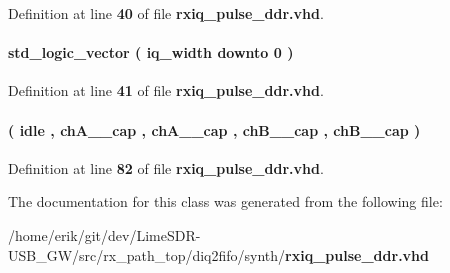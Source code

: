 Definition at line {\bf 40} of file {\bf rxiq\+\_\+pulse\+\_\+ddr.\+vhd}.

\paragraph[{reg\+\_\+l\+\_\+0}]{ {\bfseries \textcolor{comment}{std\+\_\+logic\+\_\+vector}\textcolor{vhdlchar}{ }\textcolor{vhdlchar}{(}\textcolor{vhdlchar}{ }\textcolor{vhdlchar}{ }\textcolor{vhdlchar}{ }\textcolor{vhdlchar}{ }{\bfseries {\bf iq\+\_\+width}} \textcolor{vhdlchar}{ }\textcolor{keywordflow}{downto}\textcolor{vhdlchar}{ }\textcolor{vhdlchar}{ } \textcolor{vhdldigit}{0} \textcolor{vhdlchar}{ }\textcolor{vhdlchar}{)}\textcolor{vhdlchar}{ }} \hspace{0.3cm}{\ttfamily [Signal]}}\label{classrxiq__pulse__ddr_1_1arch_af612fa4a7679a8979da2d074715ced00}


Definition at line {\bf 41} of file {\bf rxiq\+\_\+pulse\+\_\+ddr.\+vhd}.

\paragraph[{state\+\_\+type}]{ {\bfseries \textcolor{vhdlchar}{(}\textcolor{vhdlchar}{ }\textcolor{vhdlchar}{idle}\textcolor{vhdlchar}{ }\textcolor{vhdlchar}{,}\textcolor{vhdlchar}{ }\textcolor{vhdlchar}{ch\+A\+\_\+\_\+cap}\textcolor{vhdlchar}{ }\textcolor{vhdlchar}{,}\textcolor{vhdlchar}{ }\textcolor{vhdlchar}{ch\+A\+\_\+\_\+cap}\textcolor{vhdlchar}{ }\textcolor{vhdlchar}{,}\textcolor{vhdlchar}{ }\textcolor{vhdlchar}{ch\+B\+\_\+\_\+cap}\textcolor{vhdlchar}{ }\textcolor{vhdlchar}{,}\textcolor{vhdlchar}{ }\textcolor{vhdlchar}{ch\+B\+\_\+\_\+cap}\textcolor{vhdlchar}{ }\textcolor{vhdlchar}{)}\textcolor{vhdlchar}{ }} \hspace{0.3cm}{\ttfamily [Type]}}\label{classrxiq__pulse__ddr_1_1arch_aa48dc270c440aa122ccd5815799fab4c}


Definition at line {\bf 82} of file {\bf rxiq\+\_\+pulse\+\_\+ddr.\+vhd}.



The documentation for this class was generated from the following file\+:\begin{DoxyCompactItemize}
\item 
/home/erik/git/dev/\+Lime\+S\+D\+R-\/\+U\+S\+B\+\_\+\+G\+W/src/rx\+\_\+path\+\_\+top/diq2fifo/synth/{\bf rxiq\+\_\+pulse\+\_\+ddr.\+vhd}\end{DoxyCompactItemize}
